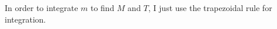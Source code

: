 \documentclass{article}
\begin{document}
In order to integrate $m$ to find $M$ and $T$, I just use the
trapezoidal rule for integration. 




\end{document}

